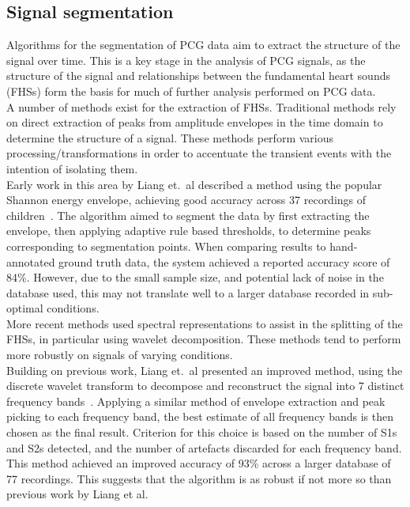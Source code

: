 \documentclass[titlepage, 12pt]{scrartcl} \usepackage{enumitem}
\begin{document}
\subsection{Signal segmentation}\label{Segmentation}
Algorithms for the segmentation of PCG data aim to extract the structure of the
signal over time. This is a key stage in the analysis of PCG signals, as the
structure of the signal and relationships between the fundamental heart sounds
(FHSs) form the basis for much of further analysis performed on PCG data.\\


A number of methods exist for the extraction of FHSs. Traditional methods rely
on direct extraction of peaks from amplitude envelopes in the time domain to
determine the structure of a signal.  These methods perform various
processing/transformations in order to accentuate the transient events with the
intention of isolating them.\\
Early work in this area by Liang et.\ al described a method using the popular
Shannon energy envelope, achieving good accuracy across 37 recordings of
children~\parencite{Liang1997b}. The algorithm aimed to segment the data by
first extracting the envelope, then applying adaptive rule based thresholds, to
determine peaks corresponding to segmentation points. When comparing results to
hand-annotated ground truth data, the system achieved a reported accuracy score
of 84\%. However, due to the small sample size, and potential lack of noise in
the database used, this may not translate well to a larger database recorded in
sub-optimal conditions.\\
More recent methods used spectral representations to assist in the splitting of
the FHSs, in particular using wavelet decomposition. These methods tend to
perform more robustly on signals of varying conditions.\\
Building on previous work, Liang et.\ al presented an improved method, using the
discrete wavelet transform to decompose and reconstruct the signal into 7
distinct frequency bands~\parencite{Liang1997a}. Applying a similar method
of envelope extraction and peak picking to each frequency band, the best
estimate of all frequency bands is then chosen as the final result. Criterion
for this choice is based on the number of S1s and S2s detected, and the number
of artefacts discarded for each frequency band. This method achieved an
improved accuracy of 93\% across a larger database of 77 recordings. This
suggests that the algorithm is as robust if not more so than previous work by
Liang et al.\\
\end{document}
